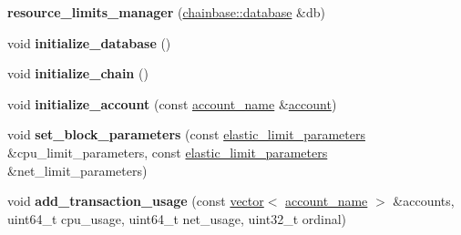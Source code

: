 \begin{DoxyCompactItemize}
\item 
\mbox{\label{classaacio_1_1chain_1_1resource__limits_1_1resource__limits__manager_a9c9fbf01eae1a7c56786718f6e46b917}} 
{\bfseries resource\+\_\+limits\+\_\+manager} (\mbox{\hyperlink{classchainbase_1_1database}{chainbase\+::database}} \&db)
\item 
\mbox{\label{classaacio_1_1chain_1_1resource__limits_1_1resource__limits__manager_aab26fce1697146ecd9237c519e0fe7f8}} 
void {\bfseries initialize\+\_\+database} ()
\item 
\mbox{\label{classaacio_1_1chain_1_1resource__limits_1_1resource__limits__manager_a3239c2d9965d7240096c516ae995ea59}} 
void {\bfseries initialize\+\_\+chain} ()
\item 
\mbox{\label{classaacio_1_1chain_1_1resource__limits_1_1resource__limits__manager_ac2da9cf89fc89b8c182cc586bec70cc9}} 
void {\bfseries initialize\+\_\+account} (const \mbox{\hyperlink{structaacio_1_1chain_1_1name}{account\+\_\+name}} \&\mbox{\hyperlink{structaccount}{account}})
\item 
\mbox{\label{classaacio_1_1chain_1_1resource__limits_1_1resource__limits__manager_abe1d525f303b01ba70ac7aa160f4a4cf}} 
void {\bfseries set\+\_\+block\+\_\+parameters} (const \mbox{\hyperlink{structaacio_1_1chain_1_1resource__limits_1_1elastic__limit__parameters}{elastic\+\_\+limit\+\_\+parameters}} \&cpu\+\_\+limit\+\_\+parameters, const \mbox{\hyperlink{structaacio_1_1chain_1_1resource__limits_1_1elastic__limit__parameters}{elastic\+\_\+limit\+\_\+parameters}} \&net\+\_\+limit\+\_\+parameters)
\item 
\mbox{\label{classaacio_1_1chain_1_1resource__limits_1_1resource__limits__manager_a7eac93da7b3ea6a58cfac2f569421870}} 
void {\bfseries add\+\_\+transaction\+\_\+usage} (const \mbox{\hyperlink{classstd_1_1vector}{vector}}$<$ \mbox{\hyperlink{structaacio_1_1chain_1_1name}{account\+\_\+name}} $>$ \&accounts, uint64\+\_\+t cpu\+\_\+usage, uint64\+\_\+t net\+\_\+usage, uint32\+\_\+t ordinal)

\end{DoxyCompactItemize}
